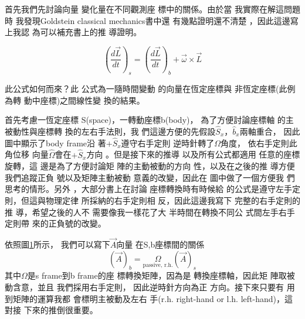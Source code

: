 \documentclass[12pt,a4paper]{article}
\begin{document}
首先我們先討論向量%
變化量在不同觀測座%
標中的關係。由於當%
我實際在解這問題時%
我發現Goldstein classical mechanics書中還%
有幾點證明還不清楚%
，因此這邊寫上我認%
為可以補充書上的推%
導證明。

\begin{equation}
\left( \frac{d\vec{L}}{dt}\right) _{s}=\left( \frac{d\vec{L}}{dt}\right)
_{b}+\vec{\omega}\times \vec{L}
\end{equation}

此公式如何而來？此%
公式為一隨時間變動%
的向量在恆定座標與%
非恆定座標(此例為轉%
動中座標)之間線性變%
換的結果。

\begin{figure}[th]
\caption{{}}
\begin{center}
\end{center}
\label{firstfig}
\end{figure}
\bigskip 

首先考慮一恆定座標%
S(space)，一轉動座標b(body)，%
為了方便討論座標軸%
的主被動性與座標轉%
換的左右手法則，我%
們這邊方便的先假設$%
\hat{S}_{x}， \hat{b}_{x}$兩軸重合，%
因此圖中顯示了body frame沿%
著$+\hat{S}_{x}$遵守右手定則%
逆時針轉了$\Omega $角度，%
依右手定則此角位移%
向量$\hat{\Omega}$會在$+\hat{S}_{x}$方向%
。但是接下來的推導%
以及所有公式都適用%
任意的座標旋轉，這%
邊是為了方便討論矩%
陣的主動被動的方向%
性，以及在之後的推%
導方便我們追蹤正負%
號以及矩陣主動被動%
意義的改變，因此在%
圖中做了一個方便我%
們思考的情形。另外%
，大部分書上在討論%
座標轉換時有時候給%
的公式是遵守左手定%
則，但這與物理定律%
所採納的右手定則相%
反，因此這邊我寫下%
完整的右手定則的推%
導，希望之後的人不%
需要像我一樣花了大%
半時間在轉換不同公%
式間左手右手定則帶%
來的正負號的改變。

\bigskip 依照圖\ref{firstfig}所示，%
我們可以寫下$\vec{A}$向量%
在S,b座標間的關係%
\begin{equation*}
\left( \vec{A}\right) _{b}=\underset{\text{passive, r.h.}}{\Omega }\left( 
\vec{A}\right) _{s}
\end{equation*}%
其中$\Omega $是s frame到b frame的座%
標轉換矩陣，因為是%
轉換座標軸，因此矩%
陣取被動含意，並且%
我們採用右手定則，%
因此逆時針方向為正%
方向。接下來只要有%
用到矩陣的運算我都%
會標明主被動及左右%
手(r.h. right-hand or l.h. left-hand)，這對接%
下來的推倒很重要。
\end{document}
